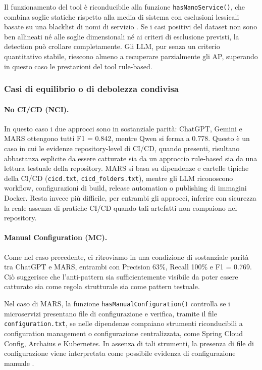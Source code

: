 Il funzionamento del tool è riconducibile alla funzione \texttt{hasNanoService()}, che combina soglie statiche rispetto alla media di sistema con esclusioni lessicali basate su una blacklist di nomi di servizio \cite{MARS, madern2024_mars}. Se i casi positivi del dataset non sono ben allineati né alle soglie dimensionali né ai criteri di esclusione previsti, la detection può crollare completamente. Gli LLM, pur senza un criterio quantitativo stabile, riescono almeno a recuperare parzialmente gli AP, superando in questo caso le prestazioni del tool rule-based.

\subsubsection*{Casi di equilibrio o di debolezza condivisa}

\paragraph{No CI/CD (NCI).}
In questo caso i due approcci sono in sostanziale parità: ChatGPT, Gemini e MARS ottengono tutti F1 = 0.842, mentre Qwen si ferma a 0.778. Questo è un caso in cui le evidenze repository-level di CI/CD, quando presenti, risultano abbastanza esplicite da essere catturate sia da un approccio rule-based sia da una lettura testuale della repository. MARS si basa su dipendenze e cartelle tipiche della CI/CD (\texttt{cicd.txt}, \texttt{cicd\_folders.txt}), mentre gli LLM riconoscono workflow, configurazioni di build, release automation o publishing di immagini Docker. Resta invece più difficile, per entrambi gli approcci, inferire con sicurezza la reale assenza di pratiche CI/CD quando tali artefatti non compaiono nel repository.


\paragraph{Manual Configuration (MC).}
Come nel caso precedente, ci ritroviamo in una condizione di sostanziale parità tra ChatGPT e MARS, entrambi con Precision 63\%, Recall 100\% e F1 = 0.769. Ciò suggerisce che l’anti-pattern sia sufficientemente visibile da poter essere catturato sia come regola strutturale sia come pattern testuale. 

Nel caso di MARS, la funzione \texttt{hasManualConfiguration()} controlla se i microservizi presentano file di configurazione e verifica, tramite il file \texttt{configuration.txt}, se nelle dipendenze compaiano strumenti riconducibili a configuration management o configurazione centralizzata, come Spring Cloud Config, Archaius e Kubernetes. In assenza di tali strumenti, la presenza di file di configurazione viene interpretata come possibile evidenza di configurazione manuale \cite{MARS, madern2024_mars}.

